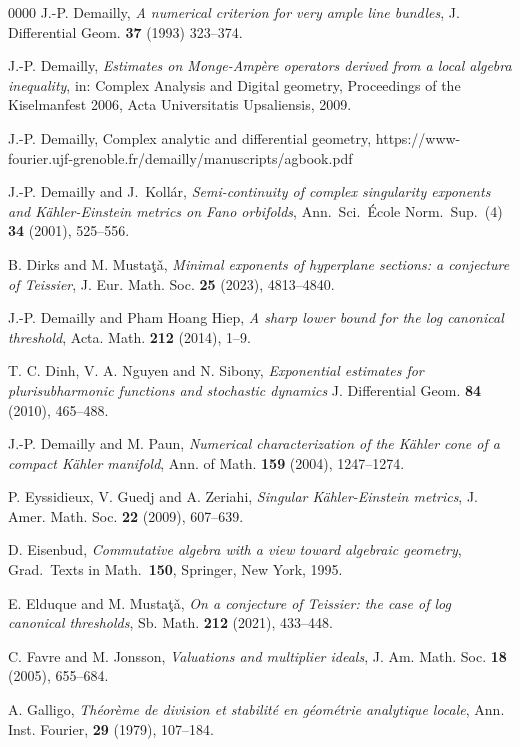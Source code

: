 \documentclass[a4paper,oneside,reqno,11pt]{article}
\begin{document}
\begin{thebibliography}{0000}
 J.-P. Demailly, {\it A numerical criterion for very ample line bundles}, J. Differential Geom. {\bf 37} (1993) 323--374.

 J.-P. Demailly, {\it Estimates on Monge-Amp\`ere operators derived from a local algebra inequality}, in: Complex Analysis and Digital geometry, Proceedings of the Kiselmanfest 2006, Acta Universitatis Upsaliensis, 2009.

 J.-P. Demailly, Complex analytic and differential geometry, https://www-fourier.ujf-grenoble.fr/demailly/manuscripts/agbook.pdf

 J.-P. Demailly and J.\ Koll\'ar, {\it Semi-continuity of complex singularity exponents and K\"ahler-Einstein metrics on Fano orbifolds}, Ann.\ Sci.\ \'{E}cole Norm.\ Sup.\ (4) {\bf 34} (2001), 525--556.

 B. Dirks and M. Musta\c{t}\v{a}, {\it Minimal exponents of hyperplane sections: a conjecture of Teissier}, J. Eur. Math. Soc. {\bf 25} (2023), 4813--4840.

 J.-P. Demailly and Pham Hoang Hiep, {\it A sharp lower bound for the log canonical threshold}, Acta. Math. {\bf 212} (2014), 1--9.

 T. C. Dinh, V. A. Nguyen and N. Sibony, {\it Exponential estimates for plurisubharmonic functions and stochastic dynamics} J. Differential Geom. {\bf 84} (2010), 465--488. 

 J.-P. Demailly and M. Paun, {\it Numerical characterization of the K\"{a}hler cone of a compact K\"{a}hler manifold}, Ann. of Math. {\bf 159} (2004), 1247--1274.

 P. Eyssidieux, V. Guedj and A. Zeriahi, {\it Singular K\"{a}hler-Einstein metrics},  J. Amer. Math. Soc. {\bf 22} (2009), 607--639. 

 D. Eisenbud, {\it Commutative algebra with a view toward algebraic geometry}, Grad.\ Texts in Math.\ {\bf 150}, Springer, New York, 1995.

 E. Elduque and M. Musta\c{t}\v{a}, {\it On a conjecture of Teissier: the case of log canonical thresholds}, Sb. Math. {\bf 212} (2021), 433--448.

 C. Favre and M. Jonsson, {\it Valuations and multiplier ideals}, J. Am. Math. Soc. {\bf 18} (2005), 655--684.

 A. Galligo, {\it Th\'eor\`eme de division et stabilit\'e en g\'eom\'etrie analytique locale}, Ann. Inst. Fourier, {\bf 29} (1979), 107--184.


\end{thebibliography}
\end{document}
